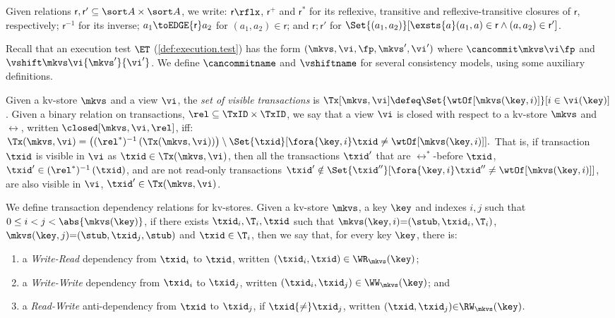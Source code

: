 Given relations \(\mathsf r, \mathsf r' \subseteq \sort A \times \sort A\),
we write:  \(\mathsf r\rflx\), \(\mathsf r^+\) and \(\mathsf r^*\) for its reflexive, transitive and reflexive-transitive closures of \(\mathsf r\), respectively;
\(\mathsf r^{-1}\) for its inverse;
\(a_1 \toEDGE{\mathsf r} a_2\) for \((a_1, a_2) \in \mathsf r\);
and \( \mathsf r; \mathsf r'\) for \( \Set{(a_1,a_2)}[\exsts{a} (a_1,a) \in \mathsf r\land (a,a_2) \in \mathsf r']\).

Recall that an  execution test \(\ET\) (\cref{def:execution.test})
has the form \((\mkvs,\vi, \fp, \allowbreak \mkvs', \vi')\) 
where  \(\cancommit \mkvs \vi \fp\) and \(\vshift \mkvs \vi {\mkvs'} {\vi'}\). 
We define \(\cancommitname\) and \(\vshiftname\) for several consistency
models, using some auxiliary definitions. 


Given a kv-store \(\mkvs\) and a view \(\vi\), the {\em set of visible
transactions} is
\( \Tx[\mkvs, \vi]  \defeq \Set{\wtOf[\mkvs(\key, i)] }[ i \in \vi(\key)] \).
Given a binary relation on transactions, \(\rel \subseteq \TxID \times \TxID\),
we say that a view \(\vi\) is closed with respect to a kv-store \(\mkvs\) and \(\rel\), written \(\closed[\mkvs,\vi,\rel]\), iff:  
\(
	\Tx(\mkvs, \vi) = 
	\left( (\rel^*)^{-1} \left( \Tx(\mkvs, \vi) \right) \right) \setminus \Set{\txid }[ \fora{\key,i} \txid \neq \wtOf[\mkvs(\key,i)] ] .
\)
That is, if transaction \(\txid\) is visible in \(\vi\) as \( \txid \in \Tx(\mkvs, \vi) \),
then all the transactions \( \txid'  \) that are \(\rel^*\)-before \(\txid\), \ie \(\txid' \in (\rel^*)^{-1} \left( \txid \right)\),
and are not read-only transactions \( \txid' \notin \Set{\txid'' }[ \fora{\key,i} \txid'' \neq \wtOf[\mkvs(\key,i)] ] \),
are also visible in \(\vi\), \ie \( \txid' \in \Tx(\mkvs, \vi) \).

We define transaction dependency relations for kv-stores.
Given a kv-store \(\mkvs\), a key \(\key\) and 
indexes \(i,j\) such that  \(0 \leq i < j < \abs{ \mkvs(\key) }\), 
if there exists \(\txid_i, \T_i, \txid\) such that 
\(\mkvs(\key, i)  {=} (\stub, \txid_{i}, \T_{i})\), \(\mkvs(\key,j) {=} (\stub, \txid_{j}, \stub)\)
and \(\txid \in \T_{i}\), 
then we say that, for every key \( \key \), there is:

\begin{enumerate} 
\item a \emph{Write-Read} dependency from \(\txid_{i}\) to \(\txid\), written \((\txid_{i},\txid) \in \WR_{\mkvs}(\key)\);
\item a \emph{Write-Write} dependency from \(\txid_{i}\) to \(\txid_{j}\), 
    written \((\txid_{i},\txid_{j}) \in \WW_{\mkvs}(\key) \); and 
\item a \emph{Read-Write} anti-dependency from \(\txid\) to \(\txid_{j}\), if 
\(\txid {\neq} \txid_{j}\), written \((\txid,\txid_j) {\in} \RW_{\mkvs}(\key)\).
\end{enumerate}

